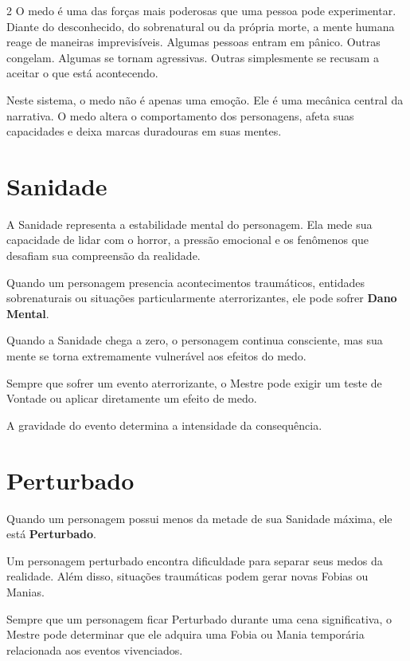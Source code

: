 \documentclass[a4paper,11pt,openany]{book}
\begin{document}
\begin{multicols}{2}
O medo é uma das forças mais poderosas que uma pessoa pode experimentar. Diante do desconhecido, do sobrenatural ou da própria morte, a mente humana reage de maneiras imprevisíveis. Algumas pessoas entram em pânico. Outras congelam. Algumas se tornam agressivas. Outras simplesmente se recusam a aceitar o que está acontecendo.

Neste sistema, o medo não é apenas uma emoção. Ele é uma mecânica central da narrativa. O medo altera o comportamento dos personagens, afeta suas capacidades e deixa marcas duradouras em suas mentes.

\section{Sanidade}

A Sanidade representa a estabilidade mental do personagem. Ela mede sua capacidade de lidar com o horror, a pressão emocional e os fenômenos que desafiam sua compreensão da realidade.

Quando um personagem presencia acontecimentos traumáticos, entidades sobrenaturais ou situações particularmente aterrorizantes, ele pode sofrer \textbf{Dano Mental}.

Quando a Sanidade chega a zero, o personagem continua consciente, mas sua mente se torna extremamente vulnerável aos efeitos do medo.

\begin{regra}
Sempre que sofrer um evento aterrorizante, o Mestre pode exigir um teste de Vontade ou aplicar diretamente um efeito de medo.

A gravidade do evento determina a intensidade da consequência.
\end{regra}

\section{Perturbado}

Quando um personagem possui menos da metade de sua Sanidade máxima, ele está \textbf{Perturbado}.

Um personagem perturbado encontra dificuldade para separar seus medos da realidade. Além disso, situações traumáticas podem gerar novas Fobias ou Manias.

\begin{regra}
Sempre que um personagem ficar Perturbado durante uma cena significativa, o Mestre pode determinar que ele adquira uma Fobia ou Mania temporária relacionada aos eventos vivenciados.
\end{regra}


\end{multicols}
\end{document}
